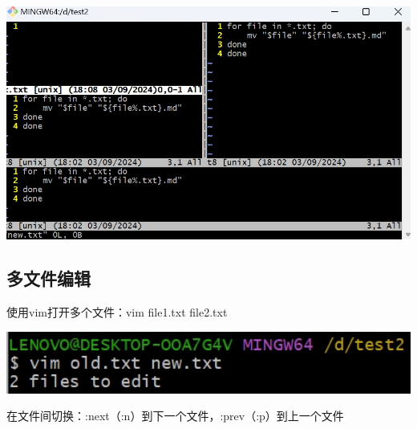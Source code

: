 \documentclass[UTF8,a4paper]{ctexart}
\begin{document}
\begin{sloppypar}
	\includegraphics[width = 16cm]{59}
	
	\subsection{多文件编辑}
	使用vim打开多个文件：vim file1.txt file2.txt
	
	\includegraphics[width = 16cm]{60}
	
	在文件间切换：:next（:n）到下一个文件，:prev（:p）到上一个文件
	

\end{sloppypar}
\end{document}
